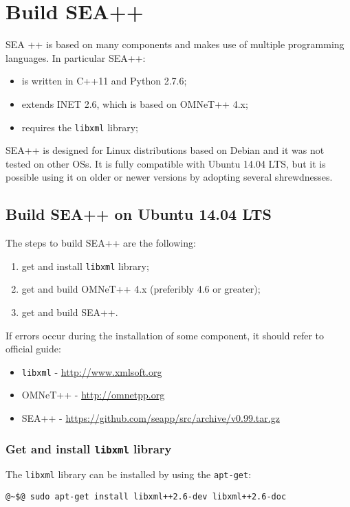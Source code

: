 


\chapter{Build SEA++}
\label{ch:build-seapp}

SEA ++ is based on many components and makes use of multiple programming languages.
In particular SEA++:
%
\begin{itemize}
\item is written in C++11 and Python 2.7.6;
\item extends INET 2.6, which is based on OMNeT++ 4.x;
\item requires the \texttt{libxml} library;
\end{itemize}

SEA++ is designed for Linux distributions based on Debian and it was not tested on other OSs.
It is fully compatible with Ubuntu 14.04 LTS, but it is possible using it on older or newer versions by adopting several shrewdnesses.


\section{Build SEA++ on Ubuntu 14.04 LTS}
The steps to build SEA++ are the following:
%
\begin{enumerate}
\item get and install \texttt{libxml} library;
\item get and build OMNeT++ 4.x (preferibly 4.6 or greater);
\item get and build SEA++.
\end{enumerate}
%
 If errors occur during the installation of some component, it should refer to official guide:
%
\begin{itemize}
\item \texttt{libxml} - \url{http://www.xmlsoft.org}
\item OMNeT++ - \url{http://omnetpp.org}
\item SEA++ - \url{https://github.com/seapp/src/archive/v0.99.tar.gz}
\end{itemize}



\subsection{Get and install \texttt{libxml} library}
The \texttt{libxml} library can be installed by using the \texttt{apt-get}:
%
\begin{lstlisting}[language={terminal}]
@~$@ sudo apt-get install libxml++2.6-dev libxml++2.6-doc
\end{lstlisting}

